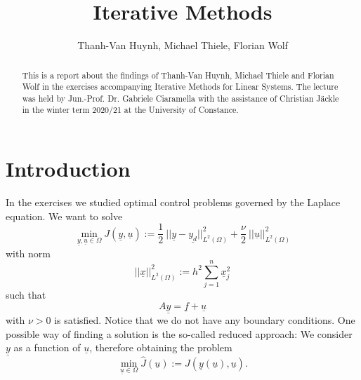 \documentclass{amsart}
\theoremstyle{definition}
\theoremstyle{remark}
\numberwithin{equation}{section}
\begin{document}
\title{Iterative Methods}

\author{Thanh-Van Huynh, Michael Thiele, Florian Wolf}


\begin{abstract}
	This is a report about the findings of Thanh-Van Huynh, Michael Thiele and Florian Wolf in the exercises accompanying Iterative Methods for Linear Systems. The lecture was held by Jun.-Prof. Dr. Gabriele Ciaramella with the assistance of Christian Jäckle in the winter term 2020/21 at the University of Constance.
\end{abstract}

\maketitle

\tableofcontents



\section{Introduction}
In the exercises we studied optimal control problems governed by the Laplace equation. We want to solve
\begin{equation*}
\min\limits_{\underline{y},\underline{u}\in\Omega} J(\underline{y},\underline{u}) := \frac{1}{2}\ ||\underline{y}-\underline{y_d}||_{L^2(\Omega)}^2 + \frac{\nu}{2}\ ||\underline{u}||_{L^2(\Omega)}^2
\end{equation*}
with norm
\begin{equation*}
||\underline{x}||_{L^2(\Omega)}^2 := h^2 \sum\limits_{j=1}^n \underline{x}_j^2
\end{equation*}
such that
\begin{equation*}
A\underline{y}=\underline{f}+\underline{u}
\end{equation*}
with $\nu>0$ is satisfied. Notice that we do not have any boundary conditions. One possible way of finding a solution is the so-called reduced approach: We consider $\underline{y}$ as a function of $\underline{u}$, therefore obtaining the problem
\begin{equation*}
\min\limits_{\underline{u}\in\Omega} \hat{J}(\underline{u}) := J(\underline{y}(\underline{u}),\underline{u}).
\end{equation*}
\end{document}
